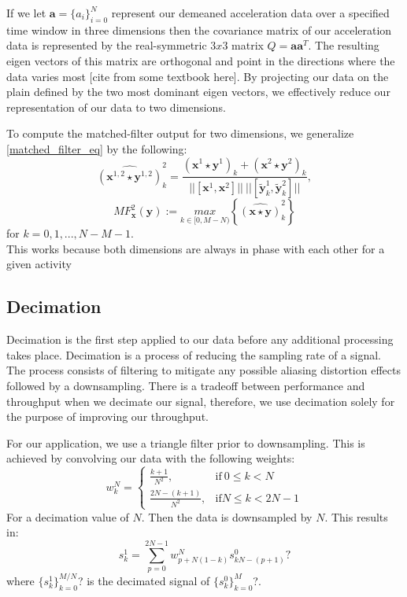 \documentclass[journal]{IEEEtran}
\begin{document}
If we let $\textbf{a} = \{a_i\}_{i=0}^{N}$ represent our demeaned acceleration data over a specified time window in three dimensions then the covariance matrix of our acceleration data is represented by the real-symmetric $3x3$ matrix $Q = \textbf{a} \textbf{a}^T$.
The resulting eigen vectors of this matrix are orthogonal and point in the directions where the data varies most [cite from some textbook here].
By projecting our data on the plain defined by the two most dominant eigen vectors, we effectively reduce our representation of our data to two dimensions.

To compute the matched-filter output for two dimensions, we generalize \eqref{matched_filter_eq} by the following:
%
\begin{equation} \label{cross_correlation_eq_2}
\widehat{(\textbf{x}^{1,2} \star \textbf{y}^{1,2})}_k^2 = \frac{(\textbf{x}^1 \star \textbf{y}^1)_k + (\textbf{x}^2 \star \textbf{y}^2)_k}{||[ \textbf{x}^1, \textbf{x}^2 ]|| \ || [ \widetilde{\textbf{y}}_k^1, \widetilde{\textbf{y}}_k^2 ] || },
\end{equation}
%
\begin{equation} \label{matched_filter_eq_2}
MF_{\textbf{x}}^2(\textbf{y}) := \underset{k \in [0, M-N)}{max} \left \{\widehat{(\textbf{x} \star \textbf{y})}^2_k \right \}
\end{equation}
%
for $ k = 0,1,...,N-M-1 $.\\
%
This works because both dimensions are always in phase with each other for a given activity
\subsection{Decimation}
Decimation is the first step applied to our data before any additional processing takes place.
Decimation is a process of reducing the sampling rate of a signal.
The process consists of filtering to mitigate any possible aliasing distortion effects followed by a downsampling.
There is a tradeoff between performance and throughput when we decimate our signal, therefore, we use decimation solely for the purpose of improving our throughput.

For our application, we use a triangle filter prior to downsampling. This is achieved by convolving our data with the following weights:
%
\begin{equation} \label{trignal_filter_weights}
w_k^N =
\begin{cases}
  \frac{k+1}{N^2}, & \text{if}\ 0 \leq k < N \\
  \frac{2N - (k + 1)}{N^2}, & \text{if} N \leq k < 2N - 1
\end{cases}
\end{equation}
%
For a decimation value of $N$. Then the data is downsampled by $N$. This results in:
%
\begin{equation} \label{decimated_signal}
s_k^1 = \sum_{p=0}^{2N-1} w_{p+N(1-k)}^N s_{kN - (p+1)}^0 ?
\end{equation}
%
where $\{s_k^1\}_{k=0}^{M/N}$? is the decimated signal of $\{s_k^0\}_{k=0}^M$?.
\end{document}
